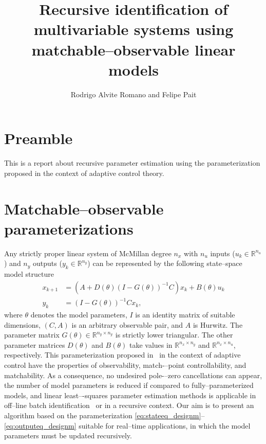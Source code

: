 \documentclass{tufte-handout}
\title[Recursive identification of MIMO systems using matchable--observable linear models]{Recursive identification of multivariable systems using matchable--observable linear models}
\author[R Romano]{Rodrigo Alvite Romano and Felipe Pait}
\date{}  %
\def\R{\mathbb{R}}
\begin{document}
\maketitle%


\section{Preamble}

This is a report about recursive parameter estimation using the parameterization proposed in the context of adaptive control theory.

\section{Matchable--observable parameterizations}

Any strictly proper linear system of McMillan degree $n_x$ with $n_u$ inputs ($u_k \in \R^{n_u}$) and $n_y$ outputs ($y_k \in \R^{n_y}$) can be represented by the following state--space model structure
\begin{align}
x_{k+1} & = \left(A + D(\theta)\left(I-G(\theta)\right)^{-1}C\right)x_{k} + B(\theta) u_{k} \label{eq:stateeq_designm} \\
y_{k} & = \left(I-G(\theta)\right)^{-1}C x_{k} \text{,} \label{eq:outputeq_designm}
\end{align}
%
where $\theta$ denotes the model parameters, $I$ is an identity matrix of suitable dimensions, $(C,A)$ is an arbitrary observable pair, and $A$ is Hurwitz. The parameter matrix $G(\theta) \in \R^{n_y \times n_y}$ is strictly lower triangular. The other parameter matrices $D(\theta)$ and $B(\theta)$ take values in $\R^{n_x \times n_y}$ and $\R^{n_x \times n_u}$, respectively. This parameterization proposed in~\cite{Morse:1994} in the context of adaptive control have the properties of observability, match-–point controllability, and matchability. As a consequence, no undesired pole-–zero cancellations can appear, the number of model parameters is reduced if compared to fully--parameterized models, and linear least–-squares parameter estimation methods is applicable in off--line batch identification~\cite{Romano:2011} or in a recursive context. Our aim is to present an algorithm based on the parameterization \eqref{eq:stateeq_designm}--\eqref{eq:outputeq_designm} suitable for real--time applications, in which the model parameters must be updated recursively.
\end{document}
